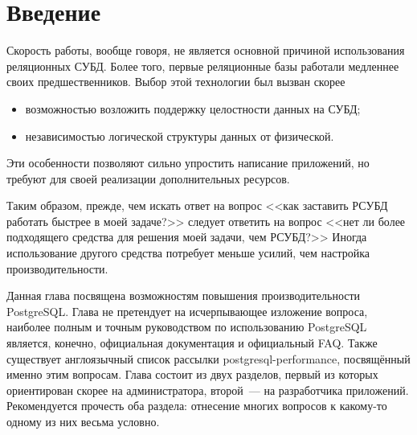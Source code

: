 \section{Введение}
Скорость работы, вообще говоря, не является основной причиной использования реляционных СУБД. 
Более того, первые реляционные базы работали медленнее своих предшественников. 
Выбор этой технологии был вызван скорее
\begin{itemize}
\item возможностью возложить поддержку целостности данных на СУБД;
\item независимостью логической структуры данных от физической.
\end{itemize}

Эти особенности позволяют сильно упростить написание приложений, но требуют для 
своей реализации дополнительных ресурсов.

Таким образом, прежде, чем искать ответ на вопрос <<как заставить РСУБД работать быстрее в моей задаче?>> 
следует ответить на вопрос <<нет ли более подходящего средства для решения моей задачи, чем РСУБД?>> 
Иногда использование другого средства потребует меньше усилий, чем настройка производительности.

Данная глава посвящена возможностям повышения производительности PostgreSQL. 
Глава не претендует на исчерпывающее изложение вопроса, наиболее полным и точным руководством по 
использованию PostgreSQL является, конечно, официальная документация и официальный FAQ. 
Также существует англоязычный список рассылки postgresql-performance, посвящённый именно этим вопросам.
Глава состоит из двух разделов, первый из которых ориентирован скорее на администратора, 
второй~--- на разработчика приложений. Рекомендуется прочесть оба раздела: отнесение многих вопросов к 
какому-то одному из них весьма условно.

